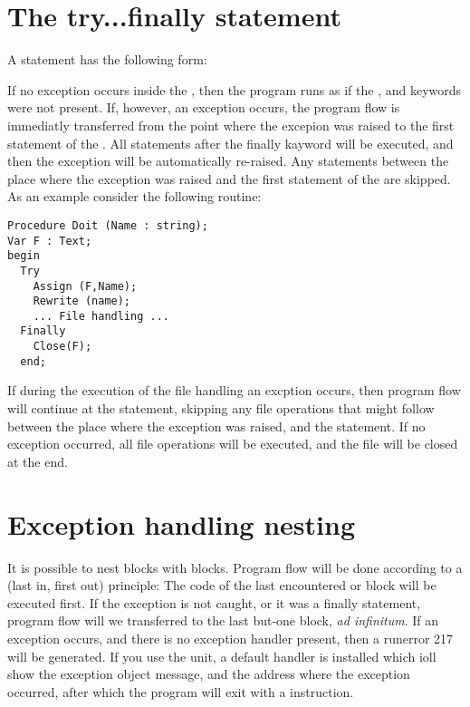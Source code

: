 \documentclass{report}
\begin{document}
\section{The try...finally statement}
A  statement has the following form:

If no exception occurs inside the , then the program
runs as if the ,  and  keywords were not
present.
If, however, an exception occurs, the program flow is immediatly
transferred from the point where the excepion was raised to the first
statement  of the .
All statements after the finally kayword will be executed, and then
the exception will be automatically re-raised. Any statements between the
place where the exception was raised and the first statement of the
 are skipped.
As an example consider the following routine:
\begin{verbatim}
Procedure Doit (Name : string);
Var F : Text;
begin
  Try
    Assign (F,Name);
    Rewrite (name);
    ... File handling ...
  Finally
    Close(F);
  end;
\end{verbatim}
If during the execution of the file handling an excption occurs, then
program flow will continue at the  statement, skipping any
file operations that might follow between the place where the exception
was raised, and the  statement.
If no exception occurred, all file operations will be executed, and the file
will be closed at the end.
\section{Exception handling nesting}
It is possible to nest  blocks with 
blocks. Program flow will be done according to a  (last in, first
out) principle: The code of the last encountered  or
  block will be executed first. If the exception is not
caught, or it was a finally statement, program flow will we transferred to
the last but-one block, {\em ad infinitum}.
If an exception occurs, and there is no exception handler present, then a
runerror 217 will be generated. If you use the  unit, a default
handler is installed which ioll show the exception object message, and the
address where the exception occurred, after which the program will exit with
a  instruction.
\end{document}
